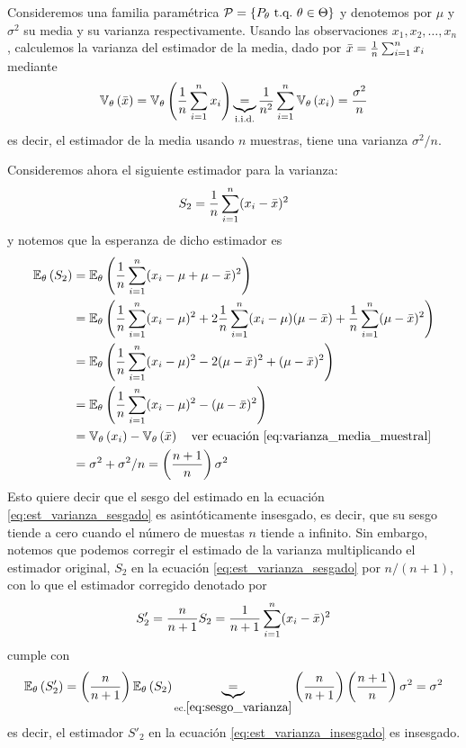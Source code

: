 \begin{example}
Consideremos una familia paramétrica $\mathcal{P} = \{P_\theta\ {\text{t.q.}}\ \theta\in\Theta\}$ y denotemos por $\mu$ y $\sigma^2$ su media y su varianza respectivamente. Usando las observaciones $x_1,x_2,\ldots,x_n$, calculemos la varianza del estimador de la media, dado por ${ \bar{x}} = \frac{1}{n}\sum_{i=1}^n x_i$ mediante
\begin{equation}
	\label{eq:varianza_media_muestral}
 	\mathbb{V}_\theta \left({ \bar{x}}\right) = \mathbb{V}_\theta \left(\frac{1}{n}	\sum_{i=1}^n x_i\right)  \underbrace{=}_{\text{i.i.d.}}  \frac{1}{n^2}	\sum_{i=1}^n\mathbb{V}_\theta \left( x_i\right) =\frac{\sigma^2}{n}
 \end{equation} 
 es decir, el estimador de la media usando $n$ muestras, tiene una varianza $\sigma^2/n$.

 Consideremos ahora el siguiente estimador para la varianza: 
\begin{equation}
	\label{eq:est_varianza_sesgado}
	S_2 = \frac{1}{n}\sum_{i=1}^n (x_i-{ \bar{x}})^2
\end{equation}
y notemos que la esperanza de dicho estimador es
\begin{align}
	\label{eq:sesgo_varianza}
	\mathbb{E}_\theta \left(S_2 \right) &= \mathbb{E}_\theta \left(\frac{1}{n}\sum_{i=1}^n (x_i-\mu+\mu-{ \bar{x}})^2\right)\nonumber\\
				&= \mathbb{E}_\theta \left( \frac{1}{n}\sum_{i=1}^n(x_i-\mu)^2 + 2\frac{1}{n}\sum_{i=1}^n(x_i-\mu)(\mu-{ \bar{x}}) + \frac{1}{n}\sum_{i=1}^n(\mu-{ \bar{x}})^2\right)\nonumber\\
				&= \mathbb{E}_\theta \left( \frac{1}{n}\sum_{i=1}^n(x_i-\mu)^2 - 2(\mu-{ \bar{x}})^2 + (\mu-{ \bar{x}})^2\right)\nonumber\\
				&= \mathbb{E}_\theta \left( \frac{1}{n}\sum_{i=1}^n(x_i-\mu)^2 - (\mu-{ \bar{x}})^2\right)\nonumber\\
				&= \mathbb{V}_\theta \left(x_i\right) - \mathbb{V}_\theta \left({ \bar{x}}\right)\quad\text{ver ecuación \eqref{eq:varianza_media_muestral}}\nonumber\\
				&= 	\sigma^2 + \sigma^2/n = \left(\frac{n+1}{n}\right)\sigma^2
\end{align}
Esto quiere decir que el sesgo del estimado en la ecuación \eqref{eq:est_varianza_sesgado} es asintóticamente insesgado, es decir, que su sesgo tiende a cero cuando el número de muestas $n$ tiende a infinito. Sin embargo, notemos que podemos corregir el estimado de la varianza multiplicando el estimador original, $S_2$ en la ecuación \eqref{eq:est_varianza_sesgado} por $n/(n+1)$, con lo que el estimador corregido denotado por 
\begin{equation}
	\label{eq:est_varianza_insesgado}
	S'_2 = \frac{n}{n+1}S_2 =  \frac{1}{n+1}\sum_{i=1}^n (x_i-{ \bar{x}})^2
\end{equation}
cumple con
\begin{equation}
	\mathbb{E}_\theta \left(S'_2 \right) =  \left(\frac{n}{n+1}\right)\mathbb{E}_\theta \left(S_2\right) \underbrace{=}_{\text{ec.}\eqref{eq:sesgo_varianza}} \left(\frac{n}{n+1}\right) \left(\frac{n+1}{n}\right)\sigma^2 = \sigma^2
\end{equation}
es decir, el estimador $S'_2$ en la ecuación \eqref{eq:est_varianza_insesgado} es insesgado.
\end{example}




